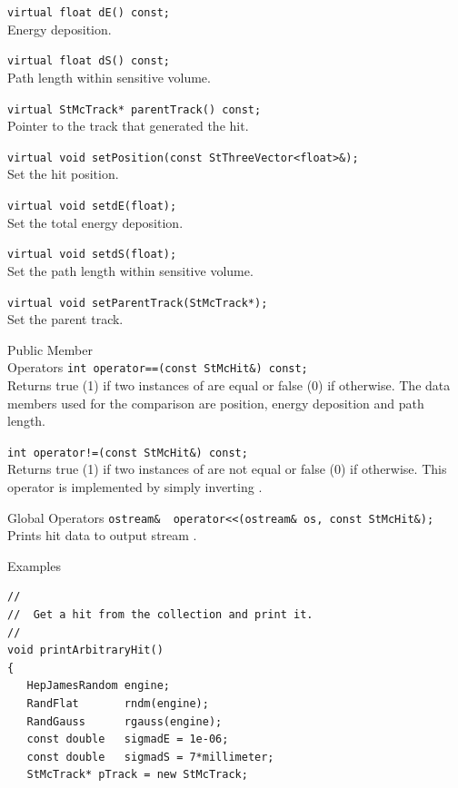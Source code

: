 \begin{Entry}
    \verb+virtual float dE() const;+\\
    Energy deposition.

    \verb+virtual float dS() const;+\\
    Path length within sensitive volume.

    \verb+virtual StMcTrack* parentTrack() const;+\\
    Pointer to the track that generated the hit.

    \verb+virtual void setPosition(const StThreeVector<float>&);+\\
    Set the hit position.

    \verb+virtual void setdE(float);+\\
    Set the total energy deposition.

    \verb+virtual void setdS(float);+\\
    Set the path length within sensitive volume.

    \verb+virtual void setParentTrack(StMcTrack*);+\\
    Set the parent track.
    
\item[Public Member\\ Operators]
    \verb+int operator==(const StMcHit&) const;+\\
    Returns true (1) if two instances of  are equal or
    false (0) if otherwise.  The data members used for the
    comparison are position, energy deposition and path length.
    

    \verb+int operator!=(const StMcHit&) const;+\\
    Returns true (1) if two instances of  are not equal or
    false (0) if otherwise.  This operator is implemented by simply
    inverting .

\item[Global Operators]
    \verb+ostream&  operator<<(ostream& os, const StMcHit&);+\\
    Prints hit data to output stream .

\item[Examples]
{\footnotesize
\begin{verbatim}
//
//  Get a hit from the collection and print it.
//
void printArbitraryHit()
{
   HepJamesRandom engine;
   RandFlat       rndm(engine);
   RandGauss      rgauss(engine);
   const double   sigmadE = 1e-06;
   const double   sigmadS = 7*millimeter;
   StMcTrack* pTrack = new StMcTrack;


\end{verbatim}}
\end{Entry}
